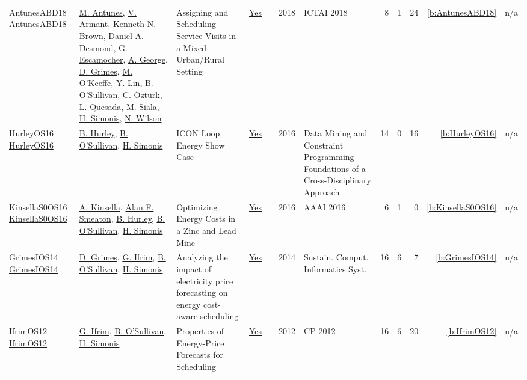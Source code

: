 {\begin{longtable}{>{\raggedright\arraybackslash}p{3cm}>{\raggedright\arraybackslash}p{6cm}>{\raggedright\arraybackslash}p{6.5cm}rrrp{2.5cm}rrrrr}
AntunesABD18 \href{https://doi.org/10.1109/ICTAI.2018.00027}{AntunesABD18} & \hyperref[auth:a884]{M. Antunes}, \hyperref[auth:a885]{V. Armant}, \hyperref[auth:a222]{Kenneth N. Brown}, \hyperref[auth:a886]{Daniel A. Desmond}, \hyperref[auth:a887]{G. Escamocher}, \hyperref[auth:a888]{A. George}, \hyperref[auth:a182]{D. Grimes}, \hyperref[auth:a889]{M. O'Keeffe}, \hyperref[auth:a890]{Y. Lin}, \hyperref[auth:a16]{B. O'Sullivan}, \hyperref[auth:a136]{C. {\"{O}}zt{\"{u}}rk}, \hyperref[auth:a891]{L. Quesada}, \hyperref[auth:a130]{M. Siala}, \hyperref[auth:a17]{H. Simonis}, \hyperref[auth:a832]{N. Wilson} & Assigning and Scheduling Service Visits in a Mixed Urban/Rural Setting & \href{../works/AntunesABD18.pdf}{Yes} & \cite{AntunesABD18} & 2018 & ICTAI 2018 & 8 & 1 & 24 & \ref{b:AntunesABD18} & n/a\\
HurleyOS16 \href{https://doi.org/10.1007/978-3-319-50137-6_15}{HurleyOS16} & \hyperref[auth:a892]{B. Hurley}, \hyperref[auth:a16]{B. O'Sullivan}, \hyperref[auth:a17]{H. Simonis} & {ICON} Loop Energy Show Case & \href{../works/HurleyOS16.pdf}{Yes} & \cite{HurleyOS16} & 2016 & Data Mining and Constraint Programming - Foundations of a Cross-Disciplinary Approach & 14 & 0 & 16 & \ref{b:HurleyOS16} & n/a\\
KinsellaS0OS16 \href{https://doi.org/10.1609/aaai.v30i2.19079}{KinsellaS0OS16} & \hyperref[auth:a1381]{A. Kinsella}, \hyperref[auth:a1382]{Alan F. Smeaton}, \hyperref[auth:a892]{B. Hurley}, \hyperref[auth:a16]{B. O'Sullivan}, \hyperref[auth:a17]{H. Simonis} & Optimizing Energy Costs in a Zinc and Lead Mine & \href{../works/KinsellaS0OS16.pdf}{Yes} & \cite{KinsellaS0OS16} & 2016 & AAAI 2016 & 6 & 1 & 0 & \ref{b:KinsellaS0OS16} & n/a\\
GrimesIOS14 \href{https://doi.org/10.1016/j.suscom.2014.08.009}{GrimesIOS14} & \hyperref[auth:a182]{D. Grimes}, \hyperref[auth:a183]{G. Ifrim}, \hyperref[auth:a16]{B. O'Sullivan}, \hyperref[auth:a17]{H. Simonis} & Analyzing the impact of electricity price forecasting on energy cost-aware scheduling & \href{../works/GrimesIOS14.pdf}{Yes} & \cite{GrimesIOS14} & 2014 & Sustain. Comput. Informatics Syst. & 16 & 6 & 7 & \ref{b:GrimesIOS14} & n/a\\
IfrimOS12 \href{https://doi.org/10.1007/978-3-642-33558-7_68}{IfrimOS12} & \hyperref[auth:a183]{G. Ifrim}, \hyperref[auth:a16]{B. O'Sullivan}, \hyperref[auth:a17]{H. Simonis} & Properties of Energy-Price Forecasts for Scheduling & \href{../works/IfrimOS12.pdf}{Yes} & \cite{IfrimOS12} & 2012 & CP 2012 & 16 & 6 & 20 & \ref{b:IfrimOS12} & n/a\\

\end{longtable}}
